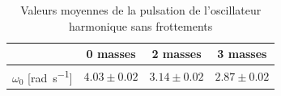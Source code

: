 \begin{table}[h]
    \centering
    \begin{tabulary}{0.9\linewidth}{C C C C}
        \toprule
        & 0 masses & 2 masses & 3 masses \\
        \midrule
        \(\omega_0\) [\si{\radian\per\second}] & \(4.03 \pm 0.02\) & \(3.14 \pm 0.02\) & \(2.87 \pm 0.02\) \\
        \bottomrule
    \end{tabulary}
    \caption{Valeurs moyennes de la pulsation de l'oscillateur harmonique sans frottements}
    \label{tab:omega0_libre}
\end{table}
